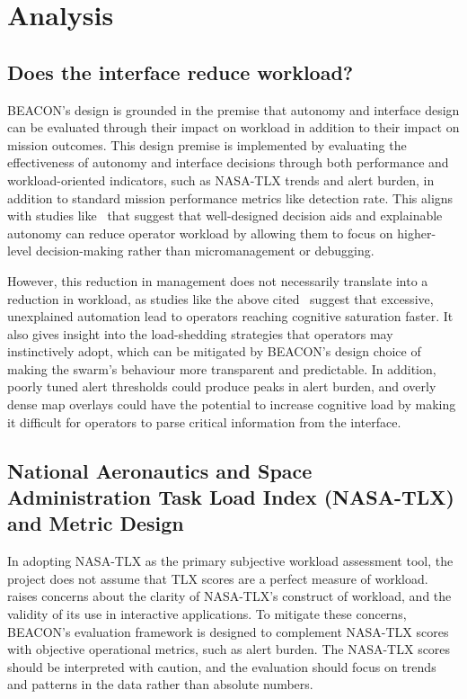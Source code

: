 \section{Analysis}\label{sec:analysis}

\subsection{Does the interface reduce workload?}\label{subsec:does-the-interface-reduce-workload}

BEACON's design is grounded in the premise that autonomy and interface design can be evaluated through their impact on workload in addition to their impact on mission outcomes.
This design premise is implemented by evaluating the effectiveness of autonomy and interface decisions through both performance and workload-oriented indicators, such as NASA-TLX trends and alert burden, in addition to standard mission performance metrics like detection rate.
This aligns with studies like~\cite{CUMMINGS2007339} that suggest that well-designed decision aids and explainable autonomy can reduce operator workload by allowing them to focus on higher-level decision-making rather than micromanagement or debugging.

However, this reduction in management does not necessarily translate into a reduction in workload, as studies like the above cited~\cite{CUMMINGS2007339} suggest that excessive, unexplained automation lead to operators reaching cognitive saturation faster.
It also gives insight into the load-shedding strategies that operators may instinctively adopt, which can be mitigated by BEACON's design choice of making the swarm's behaviour more transparent and predictable.
In addition, poorly tuned alert thresholds could produce peaks in alert burden, and overly dense map overlays could have the potential to increase cognitive load by making it difficult for operators to parse critical information from the interface.

\subsection{National Aeronautics and Space Administration Task Load Index (NASA-TLX) and Metric Design}\label{subsec:nasa-tlx-and-metric-design}

In adopting NASA-TLX as the primary subjective workload assessment tool, the project does not assume that TLX scores are a perfect measure of workload.
\cite{BABAEI2025103515} raises concerns about the clarity of NASA-TLX's construct of workload, and the validity of its use in interactive applications.
To mitigate these concerns, BEACON's evaluation framework is designed to complement NASA-TLX scores with objective operational metrics, such as alert burden.
The NASA-TLX scores should be interpreted with caution, and the evaluation should focus on trends and patterns in the data rather than absolute numbers.
